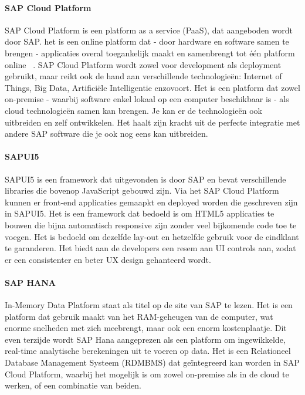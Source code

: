     \paragraph{SAP Cloud Platform}
    SAP Cloud Platform is een platform as a service (PaaS), dat aangeboden wordt door SAP. het is een online platform dat - door hardware en software samen te brengen - applicaties overal toegankelijk maakt en samenbrengt tot één platform online ~\autocite{SAPSE2018}.
    SAP Cloud Platform wordt zowel voor development als deployment gebruikt, maar reikt ook de hand aan verschillende technologieën: Internet of Things, Big Data, Artificiële Intelligentie enzovoort. Het is een platform dat zowel on-premise - waarbij software enkel lokaal op een computer beschikbaar is - als cloud technologieën samen kan brengen. Je kan er de technologieën ook uitbreiden en zelf ontwikkelen. Het haalt zijn kracht uit de perfecte integratie met andere SAP software die je ook nog eens kan uitbreiden.
    
    \paragraph{SAPUI5}
    SAPUI5 is een framework dat uitgevonden is door SAP en bevat verschillende libraries die bovenop JavaScript gebouwd zijn. Via het SAP Cloud Platform kunnen er front-end applicaties gemaapkt en deployed worden die geschreven zijn in SAPUI5. Het is een framework dat bedoeld is om HTML5 applicaties te bouwen die bijna automatisch responsive zijn zonder veel bijkomende code toe te voegen.
    Het is bedoeld om dezelfde lay-out en hetzelfde gebruik voor de eindklant te garanderen. Het biedt aan de developers een resem aan UI controls aan, zodat er een consistenter en beter UX design gehanteerd wordt.~\autocite{SAPSEa} 
    
    \paragraph{SAP HANA}
    In-Memory Data Platform staat als titel op de site van SAP te lezen. Het is een platform dat gebruik maakt van het RAM-geheugen van de computer, wat enorme snelheden met zich meebrengt, maar ook een enorm kostenplaatje. Dit even terzijde wordt SAP Hana aangeprezen als een platform om ingewikkelde, real-time analytische berekeningen uit te voeren op data.
    Het is een Relationeel Database Management Systeem (RDMBMS) dat geïntegreerd kan worden in SAP Cloud Platform, waarbij het mogelijk is om zowel on-premise als in de cloud te werken, of een combinatie van beiden.
